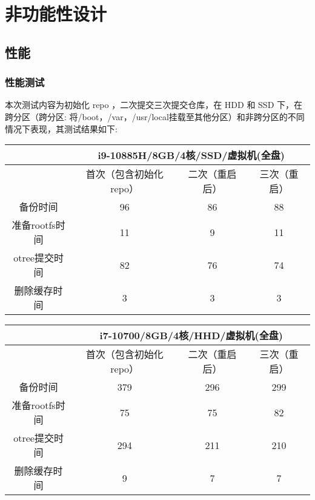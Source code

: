 \documentclass{utart}
\begin{document}
\section{非功能性设计}
\subsection{性能}
\subsubsection{性能测试}
本次测试内容为初始化 repo ，二次提交三次提交仓库，在 HDD 和 SSD 下，在跨分区（跨分区: 将/boot，/var，/usr/local挂载至其他分区）和非跨分区的不同情况下表现，其测试结果如下:
\begin{table}[H]
  \begin{tabular}{|c|ccc|}
  \hline
             & \multicolumn{3}{c|}{i9-10885H/8GB/4核/SSD/虚拟机(全盘)}                          \\ \hline
             & \multicolumn{1}{c|}{首次（包含初始化repo）} & \multicolumn{1}{c|}{二次（重启后）} & 三次（重启） \\ \hline
  备份时间       & \multicolumn{1}{c|}{96}            & \multicolumn{1}{c|}{86}      & 88     \\ \hline
  准备rootfs时间 & \multicolumn{1}{c|}{11}            & \multicolumn{1}{c|}{9}       & 11     \\ \hline
  otree提交时间  & \multicolumn{1}{c|}{82}            & \multicolumn{1}{c|}{76}      & 74     \\ \hline
  删除缓存时间     & \multicolumn{1}{c|}{3}             & \multicolumn{1}{c|}{3}       & 3      \\ \hline
  \end{tabular}
  \end{table}
\begin{table}[H]
  \begin{tabular}{|c|ccc|}
  \hline
              & \multicolumn{3}{c|}{i7-10700/8GB/4核/HHD/虚拟机(全盘)}                           \\ \hline
              & \multicolumn{1}{c|}{首次（包含初始化repo）} & \multicolumn{1}{c|}{二次（重启后）} & 三次（重启） \\ \hline
  备份时间       & \multicolumn{1}{c|}{379}           & \multicolumn{1}{c|}{296}     & 299    \\ \hline
  准备rootfs时间 & \multicolumn{1}{c|}{75}            & \multicolumn{1}{c|}{75}      & 82     \\ \hline
  otree提交时间  & \multicolumn{1}{c|}{294}           & \multicolumn{1}{c|}{211}     & 210    \\ \hline
  删除缓存时间     & \multicolumn{1}{c|}{9}             & \multicolumn{1}{c|}{7}       & 7      \\ \hline
  \end{tabular}
  \end{table}
\end{document}
